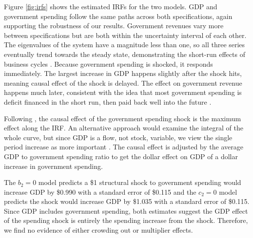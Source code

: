 Figure \ref{fig:irfs} shows the estimated IRFs for the two models. GDP and government spending follow the same paths across both specifications, again supporting the robustness of our results. Government revenues vary more between specifications but are both within the uncertainty interval of each other. The eigenvalues of the system have a magnitude less than one, so all three series eventually trend towards the steady state, demonstrating the short-run effects of business cycles \parencite{mitchell2024business}. Because government spending is shocked, it responds immediately. The largest increase in GDP happens slightly after the shock hits, meaning causal effect of the shock is delayed. The effect on government revenue happens much later, consistent with the idea that most government spending is deficit financed in the short run, then paid back well into the future \parencite{haley1941federal}.

Following \textcite{blanchard2002empirical}, the causal effect of the government spending shock is the maximum effect along the IRF. An alternative approach would examine the integral of the whole curve, but since GDP is a flow, not stock, variable, we view the single period increase as more important \parencite{deleidi2023government}. The causal effect is adjusted by the average GDP to government spending ratio to get the dollar effect on GDP of a dollar increase in government spending.

The $b_2 = 0$ model predicts a \$1 structural shock to government spending would increase GDP by \$0.990 with a standard error of \$0.115 and the $c_2 = 0$ model predicts the shock would increase GDP by \$1.035 with a standard error of \$0.115. Since GDP includes government spending, both estimates suggest the GDP effect of the spending shock is entirely the spending increase from the shock. Therefore, we find no evidence of either crowding out or multiplier effects.
